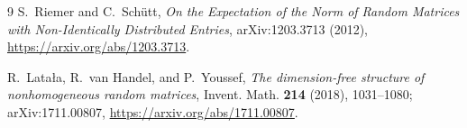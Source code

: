 \documentclass[11pt]{amsart}
\begin{document}
\begin{thebibliography}{9}
S.~Riemer and C.~Sch\"utt,
\emph{On the Expectation of the Norm of Random Matrices with
Non-Identically Distributed Entries}, arXiv:1203.3713 (2012),
\url{https://arxiv.org/abs/1203.3713}.

R.~Lata\l a, R.~van Handel, and P.~Youssef,
\emph{The dimension-free structure of nonhomogeneous random matrices},
Invent. Math. \textbf{214} (2018), 1031--1080; arXiv:1711.00807,
\url{https://arxiv.org/abs/1711.00807}.
\end{thebibliography}
\end{document}
